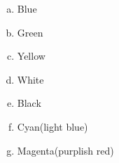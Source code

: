\answers{}

\begin{Answer}[ref={rgb-triplet}]
  \begin{enumerate}[(a)]
  \item Blue
  \item Green
  \item Yellow
  \item White
  \item Black
  \item Cyan(light blue)
  \item Magenta(purplish red)
  \end{enumerate}
\end{Answer}